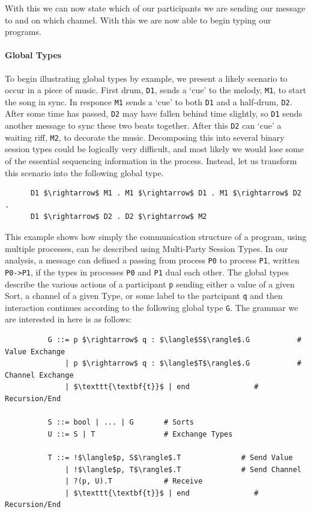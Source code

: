 \documentclass[11pt, abstracton, twoside, titlepage=true]{scrartcl}
\begin{document}
With this we can now state which of our participants we are sending our message
to and on which channel. With this we are now able to begin typing our programs.

\paragraph{Global Types}
To begin illustrating global types by example, we present a likely scenario to occur 
in a piece of music. First drum, \texttt{D1}, sends a `cue' to the melody, 
\texttt{M1}, to start the song in sync. In responce \texttt{M1} sends a `cue' to 
both \texttt{D1} and a half-drum, \texttt{D2}.  After some time has passed, 
\texttt{D2} may have fallen behind time slightly, so \texttt{D1} sends another 
message to sync these two beats together. After this \texttt{D2} can `cue' a waiting 
riff, \texttt{M2}, to decorate the music. Decomposing this into several binary 
session types could be logically very difficult, and most likely we would lose some 
of the essential sequencing information in the process. Instead, let us transform 
this scenario into the following global type.
\\
\begin{lstlisting}
      D1 $\rightarrow$ M1 . M1 $\rightarrow$ D1 . M1 $\rightarrow$ D2 .
      D1 $\rightarrow$ D2 . D2 $\rightarrow$ M2 
\end{lstlisting}

This example shows how simply the communication structure of a program, using 
multiple processes, can be described using Multi-Party Session Types. 
In our analysis, a message can defined a passing from process \texttt{P0} to 
process \texttt{P1}, written \texttt{P0->P1}, if the types in processes \texttt{P0} 
and \texttt{P1} dual each other. The global types describe the various actions of a 
participant \texttt{p} sending either a value of a given Sort, a channel of a given 
Type, or some label to the partcipant \texttt{q} and then interaction continues 
according to the following global type \texttt{G}. The grammar we are interested in 
here is as follows:
\\
\begin{lstlisting}
          G ::= p $\rightarrow$ q : $\langle$S$\rangle$.G           # Value Exchange
              | p $\rightarrow$ q : $\langle$T$\rangle$.G           # Channel Exchange
              | $\texttt{\textbf{t}}$ | end               # Recursion/End
      
          S ::= bool | ... | G       # Sorts
          U ::= S | T                # Exchange Types
      
          T ::= !$\langle$p, S$\rangle$.T              # Send Value
              | !$\langle$p, T$\rangle$.T              # Send Channel
              | ?(p, U).T            # Receive
              | $\texttt{\textbf{t}}$ | end               # Recursion/End
\end{lstlisting}
\end{document}

